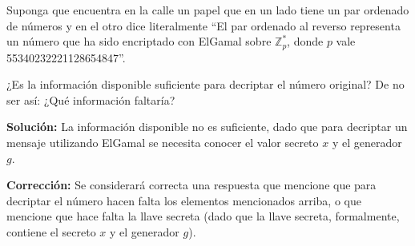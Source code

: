 
Suponga que encuentra en la calle un papel que en un lado tiene un par ordenado de números y en el otro dice literalmente ``El par ordenado al reverso representa un número que ha sido encriptado con ElGamal sobre $\mathbb{Z}_p^*$, donde $p$ vale 55340232221128654847''.

¿Es la información disponible suficiente para decriptar el número original? De no ser así: ¿Qué información faltaría?

\textbf{Solución:} La información disponible no es suficiente, dado que para decriptar un mensaje utilizando ElGamal se necesita conocer el valor secreto $x$ y el generador $g$.

\textbf{Corrección:} Se considerará correcta una respuesta que mencione que para decriptar el número hacen falta los elementos mencionados arriba, o que mencione que hace falta la llave secreta (dado que la llave secreta, formalmente, contiene el secreto $x$ y el generador $g$).
